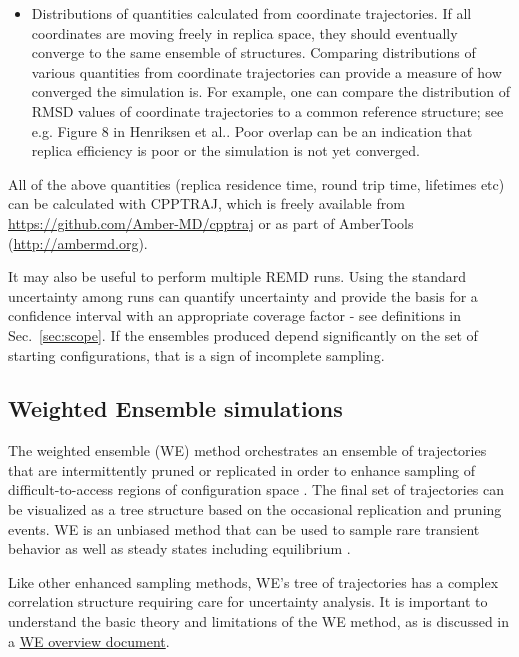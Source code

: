 \begin{itemize}
  \item Distributions of quantities calculated from coordinate trajectories. If all coordinates are moving freely in replica space, they should eventually converge to the same ensemble of structures. Comparing distributions of various quantities from coordinate trajectories can provide a measure of how converged the simulation is. For example, one can compare the distribution of RMSD values of coordinate trajectories to a common reference structure; see e.g. Figure 8 in Henriksen et al..\citep{Henriksen2013} Poor overlap can be an indication that replica efficiency is poor or the simulation is not yet converged.
\end{itemize}

All of the above quantities (replica residence time, round trip time, lifetimes etc) can be calculated with CPPTRAJ,\citep{Roe2013} which is freely available from \url{https://github.com/Amber-MD/cpptraj} or as part of AmberTools (\url{http://ambermd.org}).

It may also be useful to perform multiple REMD runs.  Using the standard uncertainty among runs can quantify uncertainty and provide the basis for a confidence interval with an appropriate coverage factor - see definitions in Sec.\ \ref{sec:scope}.  If the ensembles produced depend significantly on the set of starting configurations, that is a sign of incomplete sampling.

\subsection{Weighted Ensemble simulations}

The weighted ensemble (WE) method orchestrates an ensemble of trajectories that are intermittently pruned or replicated in order to enhance sampling of difficult-to-access regions of configuration space \cite{Huber-1996}.
The final set of trajectories can be visualized as a tree structure based on the occasional replication and pruning events.
WE is an unbiased method that can be used to sample rare transient behavior \cite{Zhang2010a} as well as steady states \cite{Bhatt2010a} including equilibrium \cite{Suarez2014}.

Like other enhanced sampling methods, WE's tree of trajectories has a complex correlation structure requiring care for uncertainty analysis.
It is important to understand the basic theory and limitations of the WE method, as is discussed in a
\href{https://westpa.github.io/westpa/overview.html}{WE overview document}.

